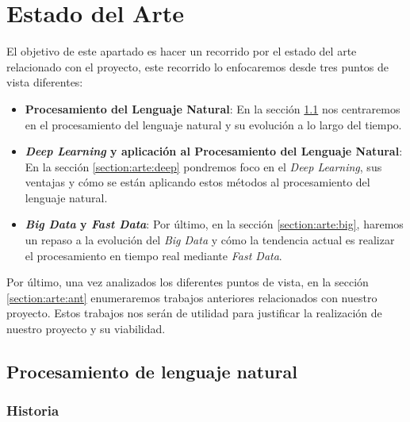 \chapter{Estado del Arte}
\label{chapter:estadoarte}


El objetivo de este apartado es hacer un recorrido por el estado del arte relacionado con el proyecto, este recorrido lo enfocaremos desde tres puntos de vista diferentes:
\begin{itemize}
	\item \textbf{Procesamiento del Lenguaje Natural}: En la sección \ref{section:arte:pln}  nos centraremos en el procesamiento del lenguaje natural y su evolución a lo largo del tiempo. 
	\item \textbf{\textit{Deep Learning} y aplicación al Procesamiento del Lenguaje Natural}: En la sección \ref{section:arte:deep}  pondremos foco en el \textit{Deep Learning}, sus ventajas y cómo se están aplicando estos métodos al procesamiento del lenguaje natural. 
	\item \textbf{\textit{Big Data} y \textit{Fast Data}}: Por último, en la sección \ref{section:arte:big}, haremos un repaso a la evolución del \textit{Big Data} y cómo la tendencia actual es realizar el procesamiento en tiempo real mediante \textit{Fast Data}.
\end{itemize}

Por último, una vez analizados los diferentes puntos de vista, en la sección \ref{section:arte:ant} enumeraremos trabajos anteriores relacionados con nuestro proyecto. Estos trabajos nos serán de utilidad para justificar la realización de nuestro proyecto y su viabilidad. 

\section{Procesamiento de lenguaje natural}
\label{section:arte:pln}

\subsection{Historia}


